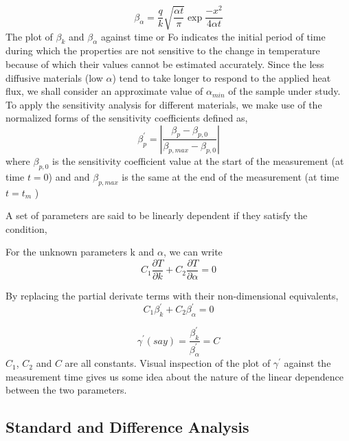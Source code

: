 \documentclass[12pt]{article}
\begin{document}
\begin{equation}
\beta_{\alpha} = \frac{q}{k}\sqrt{\frac{\alpha t}{\pi}}\exp{\frac{-x^2}{4 \alpha t}}
\end{equation}
The plot of $\beta_{k}$ and $\beta_{\alpha}$ against time or Fo
indicates the initial period of time during which the properties are not
sensitive to the change in temperature because of which their values
cannot be estimated accurately. Since the less diffusive materials (low
\(\alpha\)) tend to take longer to respond to the applied heat flux, we
shall consider an approximate value of $\alpha_{min}$ of the sample
under study. To apply the sensitivity analysis for different materials, we make use of the
normalized forms of the sensitivity coefficients defined as,
\begin{equation}
\beta_p^{'} =\left|\frac{\beta_p - \beta_{p,0}}{\beta_{p,max} - \beta_{p,0}}\right|
\end{equation}
 where $\beta_{p,0}$ is the sensitivity coefficient value at the start
of the measurement (at time $t = 0$) and and $ \beta_{p,max}$ is the
same at the end of the measurement (at time $t=t_m$ )



A set of parameters are said to be linearly dependent if they satisfy the condition,


For the unknown parameters k and $\alpha$, we can write
\begin{equation*}
 C_1 \frac{\partial T}{\partial k} + C_2 \frac{\partial T}{\partial \alpha} = 0 
\end{equation*}


By replacing the partial derivate terms with their non-dimensional equivalents,
\begin{equation*}
 C_1 \beta_{k}^{'} + C_2 \beta_{\alpha}^{'} = 0
\end{equation*}

\begin{equation*}
 \gamma^{'} (say) = \frac{\beta_k^{'}}{\beta_{\alpha}^{'}} = C
\end{equation*}
$C_1$, $C_2$ and $C$ are all constants. Visual inspection of the
 plot of $\gamma^{'}$ against the measurement time gives us some idea 
about the nature of the linear dependence between the two parameters.   

\subsection*{Standard and Difference Analysis}
\end{document}
